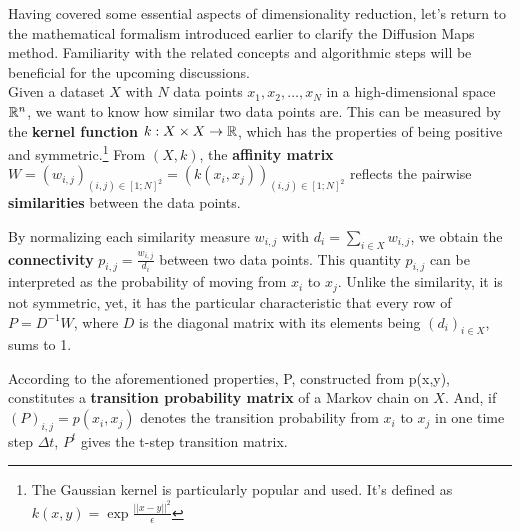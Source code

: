 Having covered some essential aspects of dimensionality reduction, let's return to the mathematical formalism introduced earlier to clarify the Diffusion Maps method. Familiarity with the related concepts and algorithmic steps will be beneficial for the upcoming discussions. \\

Given a dataset $X$ with \(N\) data points \(x_1, x_2, \ldots, x_N\) in a high-dimensional space $\mathbb{R}^n$, 
we want to know how similar two data points are. This can be measured by the \textbf{kernel function} $k: X \times X \rightarrow \mathbb{R}$, which has the properties of being positive and symmetric.\footnote{ The Gaussian kernel is particularly popular and used. It's defined as \begin{math} k(x,y)=\exp{\frac{||x-y||^2}{\epsilon}} \end{math}} %
From $(X,k)$, the \textbf{affinity matrix} $W=(w_{i,j})_{(i,j)\in[1;N]^2}=(k(x_i,x_j))_{(i,j)\in[1;N]^2}$ reflects the pairwise \textbf{similarities} between the data points. 

By normalizing each similarity measure $w_{i,j}$ with $d_i=\sum_{i\in X} w_{i,j}$, we obtain the \textbf{connectivity} $p_{i,j}=\frac{w_{i,j}}{d_i}$ between two data points. This quantity $p_{i,j}$ can be interpreted as the probability of moving from $x_i$ to $x_j$. Unlike the similarity, it is not symmetric, yet, it has the particular characteristic that every row of $P=D^{-1}W$, where $D$ is the diagonal matrix with its elements being $(d_i)_{i\in X}$, sums to 1. %

According to the aforementioned properties, P, constructed from p(x,y), constitutes a \textbf{transition probability matrix} of a Markov chain on $X$. And, if $(P)_{i,j}=p(x_i,x_j)$ denotes the transition probability from $x_i$ to $x_j$ in one time step $\Delta t$, $P^{t}$ gives the t-step transition matrix. %


